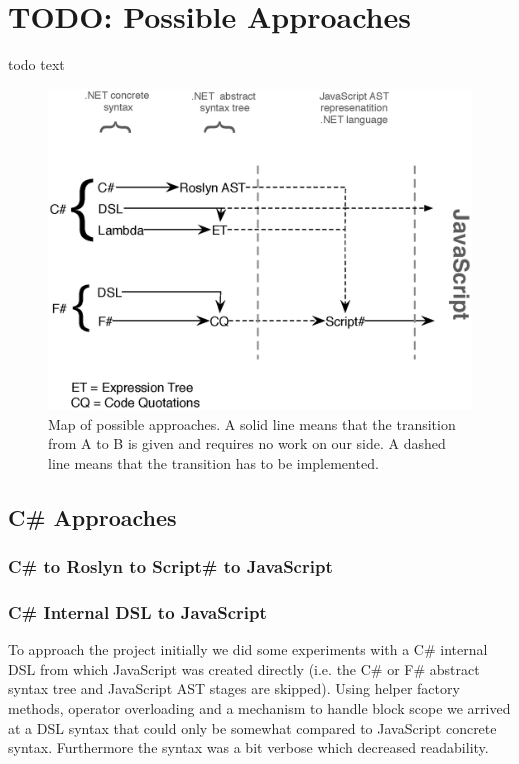 \section{TODO: Possible Approaches} %
\label{sec:possible_approaches}
	todo text

	\begin{figure}[H]
		\begin{center}
			\centerline{\includegraphics[width=14cm]{resources/images/approachComparison.eps}}
		\end{center}
		\caption{Map of possible approaches. A solid line means that the transition from A to B is given and requires no work on our side. A dashed line means that the transition has to be implemented.}
		\label{approachMap}
	\end{figure}


	\subsection{C\# Approaches} %
	\label{sub:csharp_approaches}
		
		\subsubsection{C\# to Roslyn to Script\# to JavaScript} %
		\label{ssub:c_to_roslyn_to_script_to_javascript}
		

		\subsubsection{C\# Internal DSL to JavaScript} %
		\label{ssub:c_internal_dsl_to_javascript}
			To approach the project initially we did some experiments with a C\# internal DSL from which JavaScript was created directly (i.e. the C\# or F\# abstract syntax tree and JavaScript AST stages are skipped). Using helper factory methods, operator overloading and a mechanism to handle block scope we arrived at a DSL syntax that could only be somewhat compared to JavaScript concrete syntax. Furthermore the syntax was a bit verbose which decreased readability. 

